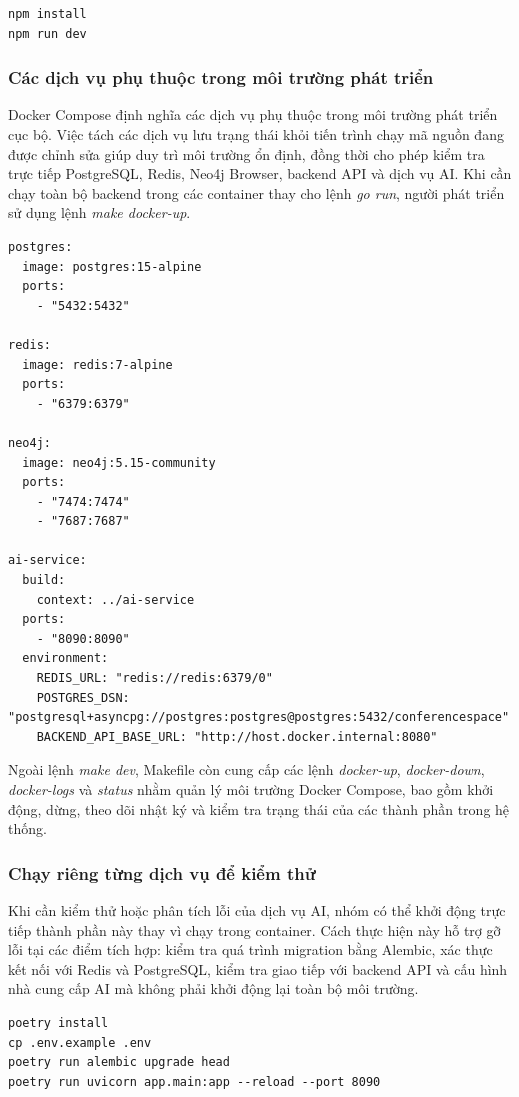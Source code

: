 \begin{lstlisting}
npm install
npm run dev
\end{lstlisting}

\subsubsection{Các dịch vụ phụ thuộc trong môi trường phát triển}

Docker Compose định nghĩa các dịch vụ phụ thuộc trong môi trường phát triển cục bộ. Việc tách các dịch vụ lưu trạng thái khỏi tiến trình chạy mã nguồn đang được chỉnh sửa giúp duy trì môi trường ổn định, đồng thời cho phép kiểm tra trực tiếp PostgreSQL, Redis, Neo4j Browser, backend API và dịch vụ AI. Khi cần chạy toàn bộ backend trong các container thay cho lệnh \textit{go run}, người phát triển sử dụng lệnh \textit{make docker-up}.

\begin{lstlisting}
postgres:
  image: postgres:15-alpine
  ports:
    - "5432:5432"

redis:
  image: redis:7-alpine
  ports:
    - "6379:6379"

neo4j:
  image: neo4j:5.15-community
  ports:
    - "7474:7474"
    - "7687:7687"

ai-service:
  build:
    context: ../ai-service
  ports:
    - "8090:8090"
  environment:
    REDIS_URL: "redis://redis:6379/0"
    POSTGRES_DSN: "postgresql+asyncpg://postgres:postgres@postgres:5432/conferencespace"
    BACKEND_API_BASE_URL: "http://host.docker.internal:8080"
\end{lstlisting}

Ngoài lệnh \textit{make dev}, Makefile còn cung cấp các lệnh \textit{docker-up}, \textit{docker-down}, \textit{docker-logs} và \textit{status} nhằm quản lý môi trường Docker Compose, bao gồm khởi động, dừng, theo dõi nhật ký và kiểm tra trạng thái của các thành phần trong hệ thống.

\subsubsection{Chạy riêng từng dịch vụ để kiểm thử}

Khi cần kiểm thử hoặc phân tích lỗi của dịch vụ AI, nhóm có thể khởi động trực tiếp thành phần này thay vì chạy trong container. Cách thực hiện này hỗ trợ gỡ lỗi tại các điểm tích hợp: kiểm tra quá trình migration bằng Alembic, xác thực kết nối với Redis và PostgreSQL, kiểm tra giao tiếp với backend API và cấu hình nhà cung cấp AI mà không phải khởi động lại toàn bộ môi trường.
\begin{lstlisting}
poetry install
cp .env.example .env
poetry run alembic upgrade head
poetry run uvicorn app.main:app --reload --port 8090
\end{lstlisting}


